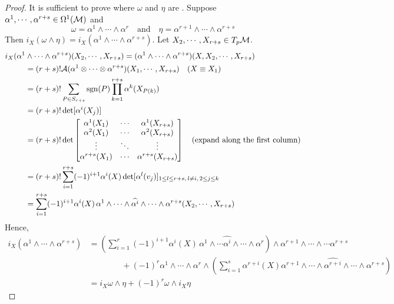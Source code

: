 \documentclass[a4paper, 10pt]{article}
\begin{document}
\begin{proof}
     It is sufficient to prove where $\omega$ and $\eta$ are . Suppose $\alpha^{1},\cdots,\alpha^{r+s} \in \Omega^{1}(\mathcal{M})$ and
    \[ \omega = \alpha^{1} \wedge \cdots \wedge \alpha^{r} \quad\text{and}\quad \eta = \alpha^{r+1} \wedge \cdots \wedge \alpha^{r+s} \]
    Then $i_{X}(\omega\wedge\eta) = i_{X}(\alpha^{1}\wedge\cdots\wedge\alpha^{r+s})$. Let $X_{2},\cdots,X_{r+s} \in T_{p}\mathcal{M}$.
    \begin{align*}
        i_{X}(\alpha^{1}&\wedge\cdots\wedge\alpha^{r+s})(X_{2},\cdots,X_{r+s}) = (\alpha^{1}\wedge\cdots\wedge\alpha^{r+s})(X,X_{2},\cdots,X_{r+s}) \\
        &= (r+s)!\mathcal{A}(\alpha^{1}\otimes\cdots\otimes\alpha^{r+s})(X_{1},\cdots,X_{r+s}) \quad(X \equiv X_{1}) \\
        &= (r+s)!\sum_{P \in S_{r+s}} \mathrm{sgn}(P)\prod_{k=1}^{r+s}\alpha^{k}(X_{P(k)}) \\
        &= (r+s)!\det[\alpha^{i}(X_{j})] \\
        &= (r+s)!\det\begin{bmatrix}\alpha^{1}(X_{1}) & \cdots & \alpha^{1}(X_{r+s}) \\ \alpha^{2}(X_{1}) & \cdots & \alpha^{2}(X_{r+s}) \\ \vdots & \ddots & \vdots \\
        \alpha^{r+s}(X_{1}) & \cdots & \alpha^{r+s}(X_{r+s})\end{bmatrix} \quad(\text{expand along the first column})\\
        &= (r+s)!\sum_{i=1}^{r+s}(-1)^{i+1}\alpha^{i}(X)\det[\alpha^{l}(v_{j})]_{1 \leq l \leq r + s,\, l \neq i,\, 2 \leq j \leq k} \\
        &= \sum_{i=1}^{r+s}(-1)^{i+1}\alpha^{i}(X) \, \alpha^{1} \wedge \cdots \wedge \widehat{\alpha^{i}} \wedge \cdots \wedge \alpha^{r+s} (X_{2}, \cdots, X_{r+s})
    \end{align*}
    Hence,
    \begin{align*}
        i_{X}(\alpha^{1}\wedge\cdots\wedge\alpha^{r+s}) &= \left(\sum_{i=1}^{r}(-1)^{i+1}\alpha^{i}(X)\,\alpha^{1}\wedge\cdots\widehat{\alpha^{i}}\wedge\cdots\wedge\alpha^{r}\right)\wedge\alpha^{r+1}\wedge\cdots\wedge\cdots\alpha^{r+s} \\
        &\qquad\qquad+(-1)^{r}\alpha^{1}\wedge\cdots\wedge\alpha^{r}\wedge\left(\sum_{i=1}^{s}\alpha^{r+i}(X)\alpha^{r+1}\wedge\cdots\wedge\widehat{\alpha^{r+i}}\wedge\cdots\wedge\alpha^{r+s}\right) \\
        &= i_{X}\omega \wedge \eta + (-1)^{r}\omega \wedge i_{X}\eta
    \end{align*}
\end{proof}
\newpage
\end{document}
